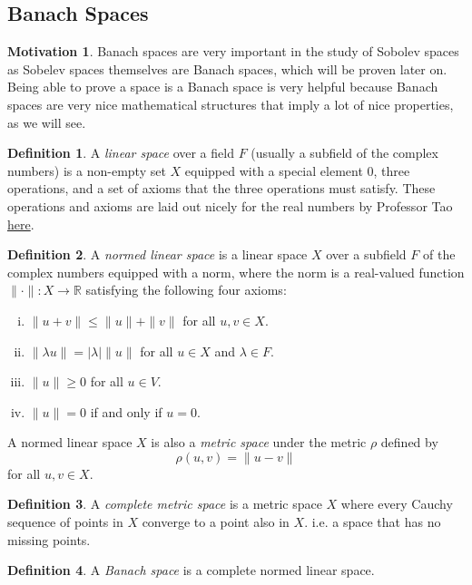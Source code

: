 \documentclass[11pt]{article}
\theoremstyle{definition}
\newtheorem*{definition}{Definition}
\newtheorem*{motivation}{Motivation}
\begin{document}
\subsection{Banach Spaces}
\begin{motivation}
Banach spaces are very important in the study of Sobolev spaces as Sobelev spaces themselves are Banach spaces, which will be proven later on.
Being able to prove a space is a Banach space is very helpful because Banach spaces are very nice mathematical structures that imply
a lot of nice properties, as we will see.
\end{motivation}
\begin{definition}
	A \textit{linear space} over a field $F$ (usually a subfield of the complex numbers) is a non-empty set $X$ equipped with a special element 0, 
	three operations, and a set of
	axioms that the three operations must satisfy. These operations and axioms are laid out nicely for the real numbers by Professor Tao
	\href{https://www.math.ucla.edu/~tao/resource/general/121.1.00s/vector_axioms.html}{here}.
\end{definition}
\begin{definition}
	A \textit{normed linear space} is a linear space $X$ over a subfield $F$ of the complex numbers equipped with a norm,
	where the norm is a real-valued function $\|\cdot\| : X \rightarrow \mathbb{R}$ satisfying the following four axioms:
	\begin{enumerate}[(i)]
		\item $\|u+v\| \leq \|u\|+\|v\|$ for all $u,v \in X$.
		\item $\|\lambda u\| = |\lambda|\|u\|$ for all $u \in X$ and $\lambda \in F$.
		\item $\|u\| \geq 0$ for all $u \in V$.
		\item $\|u\| = 0$ if and only if $u=0$.
	\end{enumerate}
	A normed linear space $X$ is also a \textit{metric space} under the metric $\rho$ defined by
	\[\rho(u,v) = \|u-v\|\]
	for all $u,v \in X$.
\end{definition}
\begin{definition}
	A \textit{complete metric space} is a metric space $X$ where every Cauchy sequence of points in $X$ converge to a point also in $X$.
	i.e. a space that has no missing points.
\end{definition}
\begin{definition}
	A \textit{Banach space} is a complete normed linear space.
\end{definition}
\end{document}
